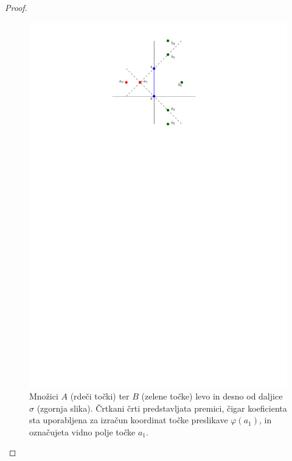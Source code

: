 \documentclass[a4paper, 12pt]{book}
\begin{document}
\begin{proof}
\begin{figure}[htp]
\centerline{\includegraphics[scale=1]{pics/dual_problem3.pdf}}
\caption{Množici $A$ (rdeči točki) ter $B$ (zelene točke) levo in desno od daljice $\sigma$ (zgornja slika). Črtkani črti predstavljata premici, čigar koeficienta sta uporabljena za izračun koordinat točke preslikave $\varphi (a_1)$, in označujeta vidno polje točke $a_1$.} 
\label{dualp}
\end{figure}


\end{proof}
\end{document}
